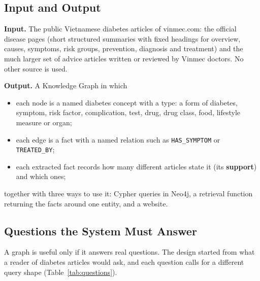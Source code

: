 \documentclass[11pt, a4paper]{article}
\newcommand{\code}[1]{\texttt{#1}}
\begin{document}
\subsection{Input and Output}

\textbf{Input.} The public Vietnamese diabetes articles of vinmec.com: the official disease pages (short structured summaries with fixed headings for overview, causes, symptoms, risk groups, prevention, diagnosis and treatment) and the much larger set of advice articles written or reviewed by Vinmec doctors. No other source is used.

\textbf{Output.} A Knowledge Graph in which
\begin{itemize}
    \item each node is a named diabetes concept with a type: a form of diabetes, symptom, risk factor, complication, test, drug, drug class, food, lifestyle measure or organ;
    \item each edge is a fact with a named relation such as \code{HAS\_SYMPTOM} or \code{TREATED\_BY};
    \item each extracted fact records how many different articles state it (its \textbf{support}) and which ones;
\end{itemize}
together with three ways to use it: Cypher queries in Neo4j, a retrieval function returning the facts around one entity, and a website.

\subsection{Questions the System Must Answer}

A graph is useful only if it answers real questions. The design started from what a reader of diabetes articles would ask, and each question calls for a different query shape (Table~\ref{tab:questions}).
\end{document}

